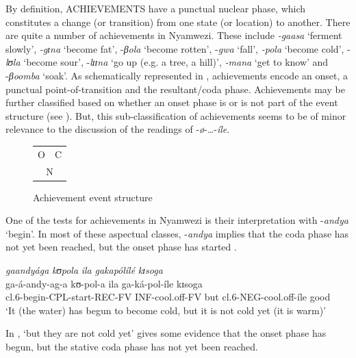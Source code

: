 \documentclass[output=paper]{langscibook}
\begin{document}
By definition, ACHIEVEMENTS have a punctual nuclear phase, which constitutes a change (or transition) from one state (or location) to another. There are quite a number of achievements in Nyamwezi. These include \textit{-gaasa} ‘ferment slowly’, \textit{-gɪ}\textit{na} ‘become fat’, -\textit{βola} ‘become rotten’, -\textit{gwa} ‘fall’, \textit{-pola} ‘become cold’, -\textit{lʊ}\textit{la} ‘become sour’, -\textit{lɪɪ}\textit{na} ‘go up (e.g. a tree, a hill)’, \textit{-mana} ‘get to know’ and -\textit{βoomba} ‘soak’. As schematically represented in , achievements encode an onset, a punctual point-of-transition and the resultant/coda phase. Achievements may be further classified based on whether an onset phase is or is not part of the event structure (see ). But, this sub-classification of achievements seems to be of minor relevance to the discussion of the readings of -\textit{ø}-\ldots-\textit{íle}.

\begin{figure}
\caption{Achievement event structure }
\begin{center}
\begin{tabularx}{.3\textwidth}{c|c}
    \cline{1-2}
     O & C\\
    \cline{1-2}
    \multicolumn{2}{c}{N}\\
\end{tabularx}
\end{center}
\label{fig:kanijo:5}
\end{figure} 

One of the tests for achievements in Nyamwezi is their interpretation with -\textit{andya} ‘begin’. In most of these aspectual classes, -\textit{andya} implies that the coda phase has not yet been reached, but the onset phase has started . 

\ea \label{ex:kanijo:9}
\glll \textit{gaandyága} \textit{kʊ}\textit{pola} \textit{ila} \textit{gakapólílé} \textit{kɪ}\textit{soga}\\
ga-á-andy-ag-a kʊ-pol-a ila ga-ká-pol-íle kɪsoga\\   
cl.6-begin-CPL-start-REC-FV INF-cool.off-FV but cl.6-NEG-cool.off-íle good\\
\glt ‘It (the water) has begun to become cold, but it is not cold yet (it is warm)’\\
\z

In , ‘but they are not cold yet’ gives some evidence that the onset phase has begun, but the stative coda phase has not yet been reached.
\end{document}
